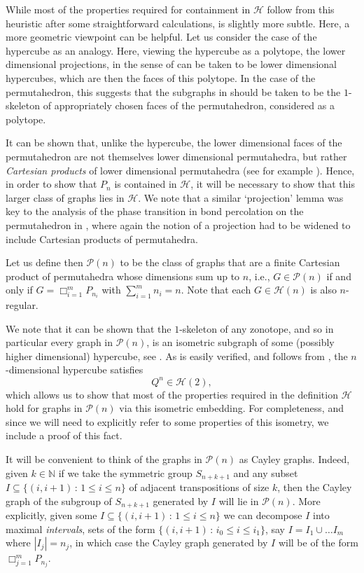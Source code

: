 \documentclass[reqno,a4paper,11pt]{amsart}
\newcounter{prop}
\theoremstyle{definition}
\newcommand{\car}{\mathbin{\Box}}
\renewcommand{\leq}{\leqslant}
\begin{document}
While most of the properties required for containment in $\mathcal{H}$ follow from this heuristic after some straightforward calculations,  is slightly more subtle.
Here, a more geometric viewpoint can be helpful.
Let us consider the case of the hypercube as an analogy.
Here, viewing the hypercube as a polytope, the lower dimensional projections, in the sense of  can be taken to be lower dimensional hypercubes, which are then the faces of this polytope.
In the case of the permutahedron, this suggests that the subgraphs in  should be taken to be the $1$-skeleton of appropriately chosen faces of the permutahedron, considered as a polytope.

It can be shown that, unlike the hypercube, the lower dimensional faces of the permutahedron are not themselves lower dimensional permutahedra, but rather \emph{Cartesian products} of lower dimensional permutahedra (see for example \cite[Proposition 2.6]{P09}).
Hence, in order to show that $P_n$ is contained in $\mathcal{H}$, it will be necessary to show that this larger class of graphs lies in $\mathcal{H}$.
We note that a similar `projection' lemma was key to the analysis of the phase transition in bond percolation on the permutahedron in \cite[Section 4]{CDE24}, where again the notion of a projection had to be widened to include Cartesian products of permutahedra.

Let us define then $\mathcal{P}(n)$ to be the class of graphs that are a finite Cartesian product of permutahedra whose dimensions sum up to $n$, i.e., $G \in \mathcal{P}(n)$ if and only if $G= \car_{i=1}^m P_{n_i}$ with $\sum_{i=1}^m n_i =n$.
Note that each $G \in \mathcal{H}(n)$ is also $n$-regular.

We note that it can be shown that the $1$-skeleton of any zonotope, and so in particular every graph in $\mathcal{P}(n)$, is an isometric subgraph of some (possibly higher dimensional) hypercube, see \cite[Lemma 3.2]{CDE24}.
As is easily verified, and follows from , the $n$-dimensional hypercube satisfies
\[
  Q^n \in \mathcal{H}(2),
\]
which allows us to show that most of the properties required in the definition $\mathcal{H}$ hold for graphs in $\mathcal{P}(n)$ via this isometric embedding.
For completeness, and since we will need to explicitly refer to some properties of this isometry, we include a proof of this fact.

It will be convenient to think of the graphs in $\mathcal{P}(n)$ as Cayley graphs.
Indeed, given $k \in \mathbb{N}$ if we take the symmetric group $S_{n+k+1}$ and any subset $I \subseteq \{ (i,i+1) \,:\, 1 \leq i \leq n\}$ of adjacent transpositions of size $k$, then the Cayley graph of the subgroup of $S_{n+k+1}$ generated by $I$ will lie in $\mathcal{P}(n)$.
More explicitly, given some $I \subseteq \{ (i,i+1) \,:\, 1 \leq i \leq n\}$ we can decompose $I$ into maximal \emph{intervals}, sets of the form $\{(i,i+1) \,:\, i_0 \leq i \leq i_1\}$, say $I=I_1\cup \ldots I_m$ where $|I_j| = n_j$, in which case the Cayley graph generated by $I$ will be of the form $\car_{j=1}^m P_{n_j}$.
\end{document}
